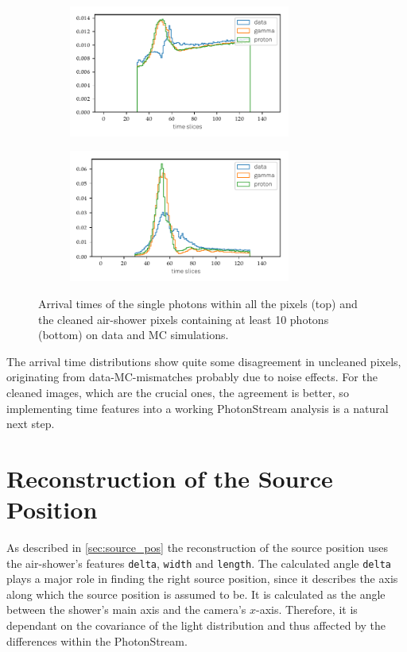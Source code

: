 \begin{figure}
  \begin{subfigure}{\textwidth}
    \centering
    \includegraphics[width=0.8\textwidth]{Plots/all_slices_min_0_per_pixel.pdf}
  \end{subfigure}
  \begin{subfigure}{\textwidth}
    \centering
    \includegraphics[width=0.8\textwidth]{Plots/all_slices_min_10_per_pixel.pdf}
  \end{subfigure}
  \caption{Arrival times of the single photons within all the pixels (top) and the cleaned air-shower pixels containing at least 10 photons (bottom) on data and MC simulations.}
  \label{fig:slices}
\end{figure}
%

The arrival time distributions show quite some disagreement in uncleaned
pixels, originating from data-MC-mismatches probably due to noise effects. For
the cleaned images, which are the crucial ones, the agreement is better, so
implementing time features into a working PhotonStream analysis is a natural
next step.

\section{Reconstruction of the Source Position}
%
As described in \autoref{sec:source_pos} the reconstruction of the source
position uses the air-shower's features \texttt{delta}, \texttt{width} and
\texttt{length}. The calculated angle \texttt{delta} plays a major role in
finding the right source position, since it describes the axis along which
the source position is assumed to be. It is calculated as the angle between
the shower's main axis and the camera's $x$-axis. Therefore, it is dependant
on the covariance of the light distribution and thus affected by the
differences within the PhotonStream.

